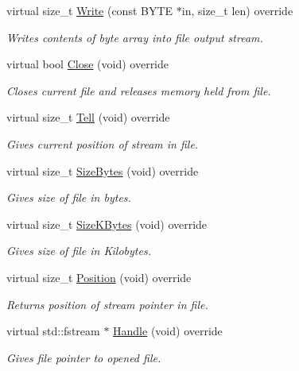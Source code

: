 \begin{DoxyCompactItemize}
virtual size\+\_\+t \hyperlink{classHatchit_1_1Core_1_1File_adca0370e5faf5e22b6b4c5993ae71e5d}{Write} (const B\+Y\+TE $\ast$in, size\+\_\+t len) override
\begin{DoxyCompactList}\small\item\em Writes contents of byte array into file output stream. \end{DoxyCompactList}\item 
virtual bool \hyperlink{classHatchit_1_1Core_1_1File_ae1a078ed489dd57396e53bcd61cbb8c0}{Close} (void) override
\begin{DoxyCompactList}\small\item\em Closes current file and releases memory held from file. \end{DoxyCompactList}\item 
virtual size\+\_\+t \hyperlink{classHatchit_1_1Core_1_1File_af28f52fda6efcbc6b452c8eef7843556}{Tell} (void) override
\begin{DoxyCompactList}\small\item\em Gives current position of stream in file. \end{DoxyCompactList}\item 
virtual size\+\_\+t \hyperlink{classHatchit_1_1Core_1_1File_a179bf2bab450ad8b7808c367b68cfcdc}{Size\+Bytes} (void) override
\begin{DoxyCompactList}\small\item\em Gives size of file in bytes. \end{DoxyCompactList}\item 
virtual size\+\_\+t \hyperlink{classHatchit_1_1Core_1_1File_a3d88ad1d8573c2b78cbd67fac6fd694f}{Size\+K\+Bytes} (void) override
\begin{DoxyCompactList}\small\item\em Gives size of file in Kilobytes. \end{DoxyCompactList}\item 
virtual size\+\_\+t \hyperlink{classHatchit_1_1Core_1_1File_ae19d803e3e7112ef1fb390c101228be6}{Position} (void) override
\begin{DoxyCompactList}\small\item\em Returns position of stream pointer in file. \end{DoxyCompactList}\item 
virtual std\+::fstream $\ast$ \hyperlink{classHatchit_1_1Core_1_1File_a4c29391e00c45e1af2abc45ddd458812}{Handle} (void) override
\begin{DoxyCompactList}\small\item\em Gives file pointer to opened file. \end{DoxyCompactList}\end{DoxyCompactItemize}
